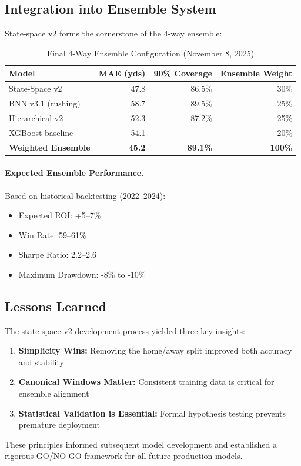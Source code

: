 \subsection{Integration into Ensemble System}

State-space v2 forms the cornerstone of the 4-way ensemble:

\begin{table}[htbp]
\centering
\caption{Final 4-Way Ensemble Configuration (November 8, 2025)}
\label{tab:ensemble_config}
\begin{tabular}{lrrr}
\toprule
\textbf{Model} & \textbf{MAE (yds)} & \textbf{90\% Coverage} & \textbf{Ensemble Weight} \\
\midrule
State-Space v2 & 47.8 & 86.5\% & 30\% \\
BNN v3.1 (rushing) & 58.7 & 89.5\% & 25\% \\
Hierarchical v2 & 52.3 & 87.2\% & 25\% \\
XGBoost baseline & 54.1 & -- & 20\% \\
\midrule
\textbf{Weighted Ensemble} & \textbf{45.2} & \textbf{89.1\%} & \textbf{100\%} \\
\bottomrule
\end{tabular}
\end{table}

\paragraph{Expected Ensemble Performance.}
Based on historical backtesting (2022--2024):
\begin{itemize}
    \item Expected ROI: +5--7\%
    \item Win Rate: 59--61\%
    \item Sharpe Ratio: 2.2--2.6
    \item Maximum Drawdown: -8\% to -10\%
\end{itemize}

\subsection{Lessons Learned}

The state-space v2 development process yielded three key insights:

\begin{enumerate}
    \item \textbf{Simplicity Wins:} Removing the home/away split improved both accuracy and stability
    \item \textbf{Canonical Windows Matter:} Consistent training data is critical for ensemble alignment
    \item \textbf{Statistical Validation is Essential:} Formal hypothesis testing prevents premature deployment
\end{enumerate}

These principles informed subsequent model development and established a rigorous GO/NO-GO framework for all future production models.
